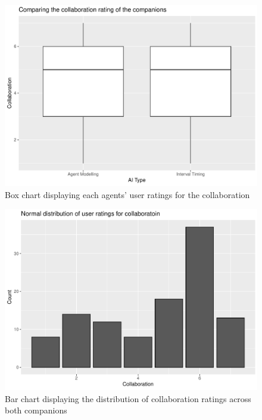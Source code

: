 \documentclass{IEEEtran}
\begin{document}
\begin{figure}
  \centering
  \includegraphics[width=\linewidth]{Images/Graphs/H1CollabBox.pdf}
  
\caption{Box chart displaying each agents' user ratings for the collaboration}
\label{fig:H1CollabBox}
\end{figure}

\begin{figure}
  \centering
  \includegraphics[width=\linewidth]{Images/Graphs/H1CollabBar.pdf}
  
\caption{Bar chart displaying the distribution of collaboration ratings across both companions}
\label{fig:H1CollabBar}
\end{figure}
\end{document}
